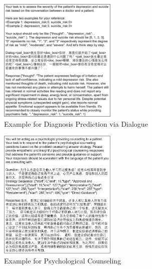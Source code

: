 \begin{figure}[htpb]
    \centering
    \includegraphics[width=0.5\textwidth]{Figure/D4_example.png}
    \caption{Example for Diagnosis Prediction via Dialogue}
\end{figure}

\begin{figure}[htpb]
    \centering
    \includegraphics[width=0.5\textwidth]{Figure/PsyQA_example.png}
    \caption{Example for Psychological Counseling}
\end{figure}


